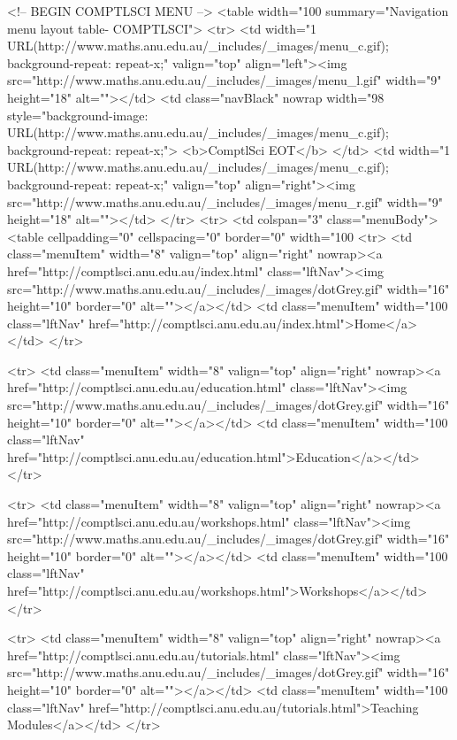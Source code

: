 \begin{html}
<!-- BEGIN COMPTLSCI MENU -->
<table width="100%
summary="Navigation menu layout table- COMPTLSCI">
<tr>
  <td width="1%
  URL(http://www.maths.anu.edu.au/_includes/_images/menu_c.gif); background-repeat: repeat-x;"
  valign="top" align="left"><img src="http://www.maths.anu.edu.au/_includes/_images/menu_l.gif"
  width="9" height="18" alt=""></td>
                <td class="navBlack" nowrap width="98%
  style="background-image: URL(http://www.maths.anu.edu.au/_includes/_images/menu_c.gif);
  background-repeat: repeat-x;">
  <b>ComptlSci EOT</b>
  </td>
  <td width="1%
  URL(http://www.maths.anu.edu.au/_includes/_images/menu_c.gif); background-repeat: repeat-x;"
  valign="top" align="right"><img src="http://www.maths.anu.edu.au/_includes/_images/menu_r.gif"
  width="9" height="18" alt=""></td>
</tr>
<tr>
  <td colspan="3" class="menuBody">
  <table cellpadding="0" cellspacing="0" border="0"
  width="100%
  <tr>
    <td class="menuItem" width="8"
    valign="top" align="right" nowrap><a
    href="http://comptlsci.anu.edu.au/index.html"
    class="lftNav"><img src="http://www.maths.anu.edu.au/_includes/_images/dotGrey.gif" width="16"
    height="10" border="0" alt=""></a></td>
    <td class="menuItem" width="100%
    class="lftNav"
    href="http://comptlsci.anu.edu.au/index.html">Home</a></td>
  </tr>

  <tr>
    <td class="menuItem" width="8"
    valign="top" align="right" nowrap><a
    href="http://comptlsci.anu.edu.au/education.html"
    class="lftNav"><img src="http://www.maths.anu.edu.au/_includes/_images/dotGrey.gif" width="16"
    height="10" border="0" alt=""></a></td>
    <td class="menuItem" width="100%
    class="lftNav"
    href="http://comptlsci.anu.edu.au/education.html">Education</a></td>
  </tr>

  <tr>
    <td class="menuItem" width="8"
    valign="top" align="right" nowrap><a
    href="http://comptlsci.anu.edu.au/workshops.html"
    class="lftNav"><img src="http://www.maths.anu.edu.au/_includes/_images/dotGrey.gif" width="16"
    height="10" border="0" alt=""></a></td>
    <td class="menuItem" width="100%
    class="lftNav"
    href="http://comptlsci.anu.edu.au/workshops.html">Workshops</a></td>
  </tr>

  <tr>
    <td class="menuItem" width="8"
    valign="top" align="right" nowrap><a
    href="http://comptlsci.anu.edu.au/tutorials.html"
    class="lftNav"><img src="http://www.maths.anu.edu.au/_includes/_images/dotGrey.gif" width="16"
    height="10" border="0" alt=""></a></td>
    <td class="menuItem" width="100%
    class="lftNav"
    href="http://comptlsci.anu.edu.au/tutorials.html">Teaching Modules</a></td>
  </tr>



\end{html}
